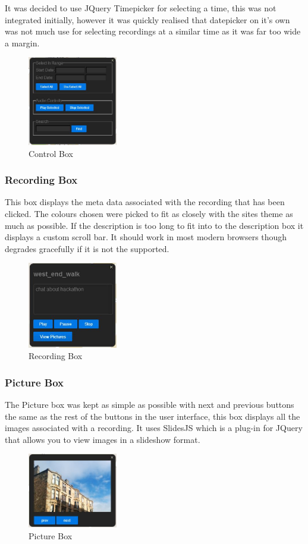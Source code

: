 \documentclass{l3proj}
\begin{document}
It was decided to use JQuery Timepicker for selecting a time, this was
not integrated initially, however it was quickly realised that
datepicker on it's own was not much use for selecting recordings at a
similar time as it was far too wide a margin. 
\begin{figure}[ht!]
  \centering
\includegraphics[width=0.35\textwidth]{images/ctrl-box.jpg}
\caption{Control Box}
\end{figure}

\subsubsection{Recording Box}
This box displays the meta data associated with the recording that has
been clicked. The colours chosen were picked to fit as closely with
the sites theme as much as possible. If the description is too long to
fit into to the description box it displays a custom  scroll bar. It
should work in most modern browsers though degrades gracefully if it
is not the supported.
\begin{figure}[ht!]
  \centering
\includegraphics[width=0.35\textwidth]{images/rec-box.jpg}
\caption{Recording Box}
\end{figure}

\subsubsection{Picture Box}
The Picture box was kept as simple as possible with next and previous
buttons the same as the rest of the buttons in the user interface,
this box displays all the images associated with a recording. It uses
SlidesJS which is a plug-in for JQuery that allows you to view images
in a slideshow format.
\begin{figure}[ht!]
  \centering
\includegraphics[width=0.35\textwidth]{images/pic-box.jpg}
\caption{Picture Box}
\end{figure}
\end{document}
